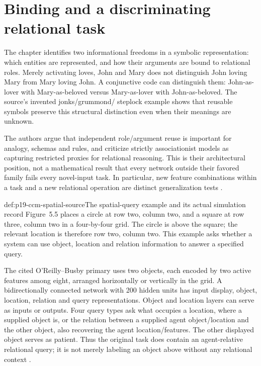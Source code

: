 \section{Binding and a discriminating relational task}
\label{sec:p19-ccm-binding}

The chapter identifies two informational freedoms in a symbolic
representation: which entities are represented, and how their arguments
are bound to relational roles. Merely activating loves, John and Mary
does not distinguish John loving Mary from Mary loving John. A
conjunctive code can distinguish them: John-as-lover with Mary-as-beloved
versus Mary-as-lover with John-as-beloved. The source's invented jonks/grummond/
steplock example shows that reusable symbols preserve this structural
distinction even when their meanings are unknown.

The authors argue that independent role/argument reuse is important for
analogy, schemas and rules, and criticize strictly associationist models
as capturing restricted proxies for relational reasoning. This is their
architectural position, not a mathematical result that every network
outside their favored family fails every novel-input task. In particular,
new feature combinations within a task and a new relational operation
are distinct generalization tests
\parencite[pp.~58--60]{DoumasHummel2012HigherCognition}.

\begin{hbexample}{def:p19-ccm-spatial-source}{The spatial-query example and its actual simulation record}
Figure~5.5 places a circle at row two, column two, and a square at row
three, column two in a four-by-four grid. The circle is above the square;
the relevant location is therefore row two, column two. This example
asks whether a system can use object, location and relation information
to answer a specified query.

The cited O'Reilly--Busby primary uses two objects, each encoded by two
active features among eight, arranged horizontally or vertically in
the grid. A bidirectionally connected network with 200 hidden units
has input display, object, location, relation and query representations.
Object and location layers can serve as inputs or outputs. Four query
types ask what occupies a location, where a supplied object is, or the
relation between a supplied agent object/location and the other object,
also recovering the agent location/features. The other displayed
object serves as patient. Thus the original task does contain an
agent-relative relational query; it is not merely labeling an object
above without any relational context
\parencite[pp.~4--5]{OReillyBusby2002Binding}.
\end{hbexample}

